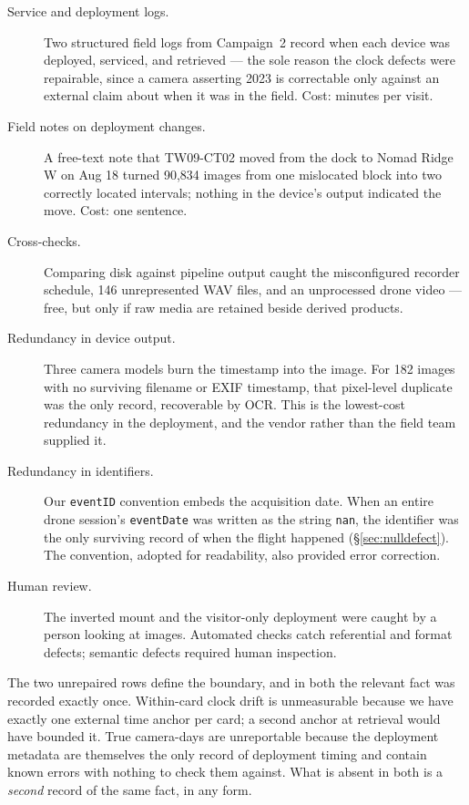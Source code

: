 \documentclass[sigconf]{acmart}
\begin{document}
\begin{description}
\item[Service and deployment logs.] Two structured field logs from
Campaign~2 record when each device was deployed, serviced, and
retrieved --- the sole reason the clock defects were repairable, since a
camera asserting 2023 is correctable only against an external claim
about when it was in the field. Cost: minutes per visit.

\item[Field notes on deployment changes.] A free-text note that
TW09-CT02 moved from the dock to Nomad Ridge W on Aug 18 turned
90{,}834 images from one mislocated block into two correctly located
intervals; nothing in the device's output indicated the move. Cost: one
sentence.

\item[Cross-checks.] Comparing disk against pipeline output caught the
misconfigured recorder schedule, 146 unrepresented WAV files, and an
unprocessed drone video --- free, but only if raw media are retained
beside derived products.

\item[Redundancy in device output.] Three camera models burn the
timestamp into the image. For 182 images with no surviving filename or
EXIF timestamp, that pixel-level duplicate was the only record,
recoverable by OCR. This is the lowest-cost redundancy in the
deployment, and the vendor rather than the field team supplied it.

\item[Redundancy in identifiers.] Our \texttt{eventID}
convention embeds the acquisition date. When an entire drone session's
\texttt{eventDate} was written as the string \texttt{nan}, the
identifier was the only surviving record of when the flight happened
(\S\ref{sec:nulldefect}). The convention, adopted for readability,
also provided error correction.

\item[Human review.] The inverted mount and the visitor-only deployment
were caught by a person looking at images. Automated checks catch
referential and format defects; semantic defects required human
inspection.
\end{description}

The two unrepaired rows define the boundary, and in both the relevant
fact was recorded exactly once. Within-card clock drift is unmeasurable because
we have exactly one external time anchor per card; a second anchor at
retrieval would have bounded it. True camera-days are unreportable
because the deployment metadata are themselves the only record of
deployment timing and contain known errors with nothing to check them
against. What is absent in both is a \emph{second} record of the same
fact, in any form.
\end{document}
